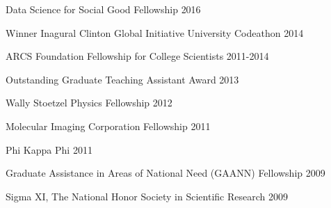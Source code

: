 


\begin{cvhonors}

  \cvhonor
    {} %
    {Data Science for Social Good Fellowship} %
    {} %
    {2016} %

  \cvhonor
    {} %
    {Winner Inagural Clinton Global Initiative University Codeathon} %
    {} %
    {2014} %

  \cvhonor
    {} %
    {ARCS Foundation Fellowship for College Scientists} %
    {} %
    {2011-2014} %

  \cvhonor
    {} %
    {Outstanding Graduate Teaching Assistant Award} %
    {} %
    {2013} %

  \cvhonor
    {} %
    {Wally Stoetzel Physics Fellowship} %
    {} %
    {2012} %

  \cvhonor
    {} %
    {Molecular Imaging Corporation Fellowship} %
    {} %
    {2011} %

  \cvhonor
    {} %
    {Phi Kappa Phi} %
    {} %
    {2011} %

  \cvhonor
    {} %
    {Graduate Assistance in Areas of National Need (GAANN) Fellowship} %
    {} %
    {2009} %

  \cvhonor
    {} %
    {Sigma XI, The National Honor Society in Scientific Research} %
    {} %
    {2009} %


\end{cvhonors}
